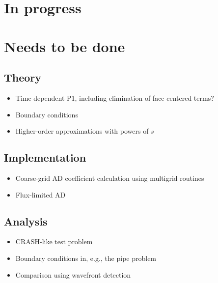 \documentclass[11pt]{SRJresearch}
\begin{document}
\section{In progress}

\section{Needs to be done}

\subsection{Theory}
\begin{itemize}
  \item Time-dependent P1, including elimination of face-centered terms?
  \item Boundary conditions
  \item Higher-order approximations with powers of $s$
\end{itemize}

\subsection{Implementation}
\begin{itemize}
  \item Coarse-grid AD coefficient calculation using multigrid routines
  \item Flux-limited AD
\end{itemize}

\subsection{Analysis}
\begin{itemize}
  \item CRASH-like test problem
  \item Boundary conditions in, e.g., the pipe problem
  \item Comparison using wavefront detection
\end{itemize}


\end{document}
